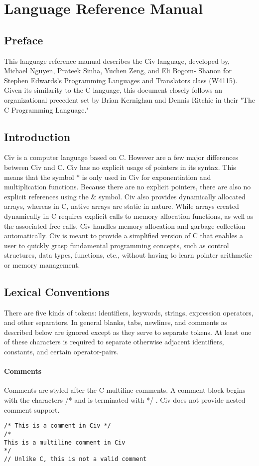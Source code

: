 \documentclass[a4paper]{article}
\begin{document}
\section{Language Reference Manual}
\subsection{Preface}
This language reference manual describes the Civ language, developed by, Michael Nguyen, Prateek Sinha, Yuchen Zeng, and Eli Bogom- Shanon for Stephen Edwards's Programming Languages and Translators class (W4115).
Given its similarity to the C language, this document closely follows an organizational precedent set by Brian Kernighan and Dennis Ritchie in their "The C Programming Language."


\subsection{Introduction}
Civ is a computer language based on C. However are a few major differences between Civ and C. Civ has no explicit usage of pointers in its syntax. This means that the symbol * is only used in Civ for exponentiation and multiplication functions. Because there are no explicit pointers, there are also no explicit references using the \& symbol. Civ also provides dynamically allocated arrays, whereas in C, native arrays are static in nature. While arrays created dynamically in C requires explicit calls to memory allocation functions, as well as the associated free calls, Civ handles memory allocation and garbage collection automatically. Civ is meant to provide a simplified version of C that enables a user to quickly grasp fundamental programming concepts, such as control structures, data types, functions, etc., without having to learn pointer arithmetic or memory management.

 
\subsection{Lexical Conventions}
There are five kinds of tokens: identifiers, keywords, strings, expression operators, and other separators. In general blanks, tabs, newlines, and comments as described below are ignored except as they serve to separate tokens. At least one of these characters is required to separate otherwise adjacent identifiers, constants, and certain operator-pairs. 

\paragraph{Comments}
Comments are styled after the C multiline comments. A comment block begins with the characters /* and is terminated with */ . Civ does not provide nested comment support.
\begin{verbatim}
/* This is a comment in Civ */
/*
This is a multiline comment in Civ
*/
// Unlike C, this is not a valid comment
\end{verbatim}
\end{document}
